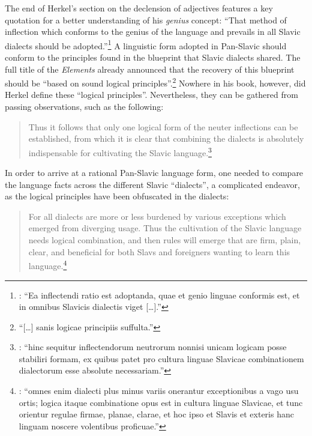 \largerpage[-1]
The end of Herkel’s section on the declension of adjectives features a key quotation for a better understanding of his \textit{genius} concept: “That method of inflection which conforms to the genius of the language and prevails in all Slavic dialects should be adopted.”\footnote{\citet[95]{herkel_elementa_1826}: “Ea inflectendi ratio est adoptanda, quae et genio linguae conformis est, et in omnibus Slavicis dialectis viget […].”} A linguistic form adopted in Pan-Slavic should conform to the principles found in the blue\-print that Slavic dialects shared. The full title of the \textit{Elements} already announced that the recovery of this blueprint should be “based on sound logical principles”.\footnote{\citet[title page]{herkel_elementa_1826} “[…] sanis logicae principiis suffulta.”} Nowhere in his book, however, did Herkel define these “logical principles”. Nevertheless, they can be gathered from passing observations, such as the following:

\begin{quote}
   Thus it follows that only one logical form of the neuter inflections can be established, from which it is clear that combining the dialects is absolutely indispensable for cultivating the Slavic language.\footnote{\citet[19]{herkel_elementa_1826}: “hinc sequitur inflectendorum neutrorum nonnisi unicam logicam posse stabiliri formam, ex quibus patet pro cultura linguae Slavicae combinationem dialectorum esse absolute necessariam.”}
\end{quote}

\noindent In order to arrive at a rational Pan-Slavic language form, one needed to compare the language facts across the different Slavic “dialects”, a complicated endeavor, as the logical principles have been obfuscated in the dialects:

\begin{quote}
    For all dialects are more or less burdened by various exceptions which emerged from diverging usage. Thus the cultivation of the Slavic language needs logical combination, and then rules will emerge that are firm, plain, clear, and beneficial for both Slavs and foreigners wanting to learn this language.\footnote{\citet[22]{herkel_elementa_1826}: “omnes enim dialecti plus minus variis onerantur exceptionibus a vago usu ortis; logica itaque combinatione opus est in cultura linguae Slavicae, et tunc orientur regulae firmae, planae, clarae, et hoc ipso et Slavis et exteris hanc linguam noscere volentibus proficuae.”}
\end{quote}

